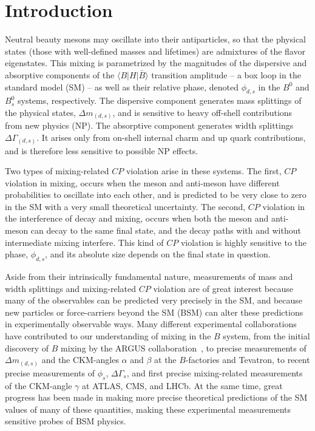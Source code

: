\section{Introduction}
Neutral beauty mesons may oscillate into their antiparticles, so that the 
physical states (those with well-defined masses and lifetimes) are admixtures of the flavor eigenstates. This mixing is parametrized by the magnitudes 
of the dispersive and absorptive components of the $\langle B | H |\bar{B}\rangle$ transition amplitude -- a box loop in the standard model (SM) -- as well as their relative phase, denoted $\phi_{d,s}$ in the $B^0$ and $B^0_s$ systems, respectively. The dispersive component generates mass splittings of the physical states, $\Delta m_{(d,s)}$, and is sensitive to heavy off-shell contributions from new physics (NP). The absorptive component generates width splittings $\Delta\Gamma_{(d,s)}$. It arises only from on-shell internal charm and up quark contributions, and is therefore less sensitive to possible NP effects.


Two types of mixing-related $CP$ violation arise in these systems. The first, $CP$ violation in mixing, occurs when the meson and anti-meson have different
probabilities to oscillate into each other, and is predicted to be very close to zero in the SM with a very
small theoretical uncertainty. The second, $CP$ violation in the interference of decay and mixing, occurs when both the meson
and anti-meson can decay to the same final state, and the decay paths with and without intermediate mixing interfere. This kind of $CP$
violation is highly sensitive to the phase, $\phi_{d,s}$, and its absolute size depends on the final state in question.

Aside from their intrinsically fundamental nature, measurements of mass and width splittings and mixing-related $CP$ violation are
of great interest because many of the observables can be predicted very precisely in the SM, and because new particles or force-carriers
beyond the SM (BSM) can alter these predictions in experimentally observable ways. Many different experimental collaborations have contributed
to our understanding of mixing in the $B$ system, from the initial discovery of $B$ mixing by the ARGUS collaboration~\cite{Prentice:1987ap}, to precise measurements
of $\Delta m_{(d,s)}$ and the CKM-angles $\alpha$ and $\beta$ at the $B$-factories and Tevatron, to recent precise measurements
of $\phi_s$, $\Delta\Gamma_s$, and first precise mixing-related measurements of the CKM-angle $\gamma$ at ATLAS, CMS, and LHCb. At the same
time, great progress has been made in making more precise theoretical predictions of the SM values of many of these quantities, making
these experimental measurements sensitive probes of BSM physics.

